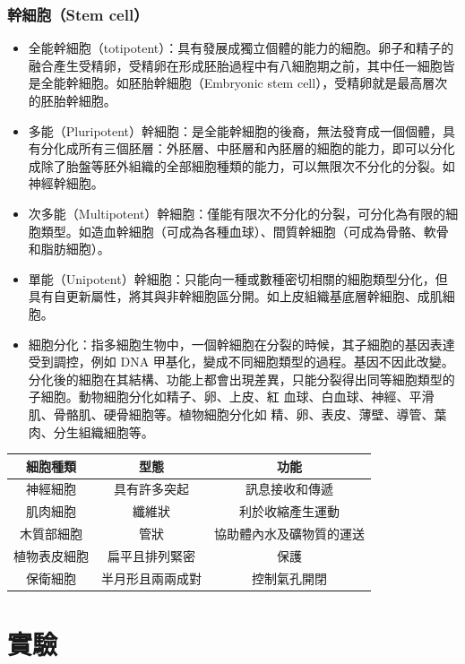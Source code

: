 \documentclass[a4paper,12pt]{report}
\begin{document}
\subsubsection{幹細胞（Stem cell）}
\begin{itemize}
  \item 全能幹細胞（totipotent）：具有發展成獨立個體的能力的細胞。卵子和精子的融合產生受精卵，受精卵在形成胚胎過程中有八細胞期之前，其中任一細胞皆是全能幹細胞。如胚胎幹細胞（Embryonic stem cell），受精卵就是最高層次的胚胎幹細胞。
  \item 多能（Pluripotent）幹細胞：是全能幹細胞的後裔，無法發育成一個個體，具有分化成所有三個胚層：外胚層、中胚層和內胚層的細胞的能力，即可以分化成除了胎盤等胚外組織的全部細胞種類的能力，可以無限次不分化的分裂。如神經幹細胞。
  \item 次多能（Multipotent）幹細胞：僅能有限次不分化的分裂，可分化為有限的細胞類型。如造血幹細胞（可成為各種血球）、間質幹細胞（可成為骨骼、軟骨和脂肪細胞）。
  \item 單能（Unipotent）幹細胞：只能向一種或數種密切相關的細胞類型分化，但具有自更新屬性，將其與非幹細胞區分開。如上皮組織基底層幹細胞、成肌細胞。
  \item 細胞分化：指多細胞生物中，一個幹細胞在分裂的時候，其子細胞的基因表達受到調控，例如 DNA 甲基化，變成不同細胞類型的過程。基因不因此改變。分化後的細胞在其結構、功能上都會出現差異，只能分裂得出同等細胞類型的子細胞。動物細胞分化如精子、卵、上皮、紅 血球、白血球、神經、平滑肌、骨骼肌、硬骨細胞等。植物細胞分化如 精、卵、表皮、薄壁、導管、葉肉、分生組織細胞等。
\end{itemize}
\begin{longtable}[c]{|c|c|c|}
\hline
細胞種類 & 型態 & 功能 \\ \hline
神經細胞 & 具有許多突起 & 訊息接收和傳遞 \\ \hline
肌肉細胞 & 纖維狀 & 利於收縮產生運動 \\ \hline
木質部細胞 & 管狀 & 協助體內水及礦物質的運送 \\ \hline
植物表皮細胞 & 扁平且排列緊密 & 保護 \\ \hline
保衛細胞 & 半月形且兩兩成對 & 控制氣孔開閉 \\ \hline
\end{longtable}
\section{實驗}
\end{document}
